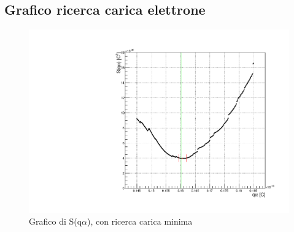 \subsection{Grafico ricerca carica elettrone}
\begin{figure}[H]
    \centering
    \includegraphics[width=\textwidth,height=\textheight,keepaspectratio]{graph1.pdf}
    \caption{Grafico di S(q$\alpha$), con ricerca carica minima}
\end{figure}
